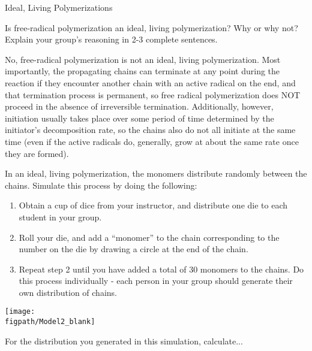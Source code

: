 \begin{activity}{Ideal, Living Polymerizations}
\begin{ctqs}

	\question Is free-radical polymerization an ideal, living polymerization?  Why or why not?  Explain your group's reasoning in 2-3 complete sentences.
	
		\begin{solution}[2in]
			No, free-radical polymerization is not an ideal, living polymerization.  Most importantly, the propagating chains can terminate at any point during the reaction if they encounter another chain with an active radical on the end, and that termination process is permanent, so free radical polymerization does NOT proceed in the absence of irreversible termination.  Additionally, however, initiation usually takes place over some period of time determined by the initiator's decomposition rate, so the chains also do not all initiate at the same time (even if the active radicals do, generally, grow at about the same rate once they are formed).
		\end{solution}

\end{ctqs}

\begin{model}
	\label{\labelbase:mdl:poisson}

		In an ideal, living polymerization, the monomers distribute randomly between the chains.  Simulate this process by doing the following:
		\begin{enumerate}
			\item Obtain a cup of dice from your instructor, and distribute one die to each student in your group.
			\item Roll your die, and add a ``monomer'' to the chain corresponding to the number on the die by drawing a circle at the end of the chain.
			\item Repeat step 2 until you have added a total of 30 monomers to the chains.  Do this process individually - each person in your group should generate their own distribution of chains.
		\end{enumerate}
		
		\centerline{\texttt{[image: \\figpath/Model2\_blank]}}
	
\end{model}

\begin{ctqs}
	
	\question For the distribution you generated in this simulation, calculate... \label{\labelbase:ctq:simulationcalcs}
	

\end{ctqs}
\end{activity}
